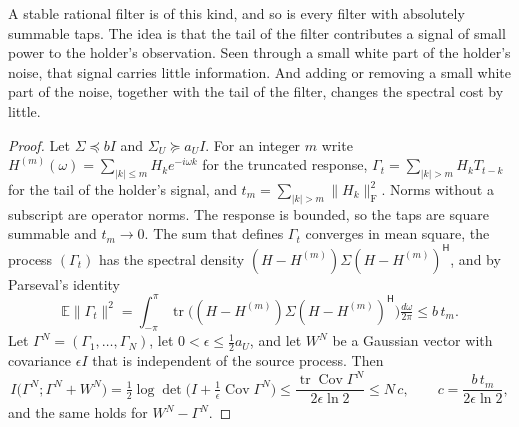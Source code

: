 \documentclass[11pt,onecolumn]{IEEEtran}
\newcommand{\E}{\mathbb{E}}
\newcommand{\tr}{\operatorname{tr}}
\newcommand{\Cov}{\operatorname{Cov}}
\newcommand{\dw}{\tfrac{d\omega}{2\pi}}
\newcommand{\herm}{\mathsf H}
\begin{document}
A stable rational filter is of this kind, and so is every filter with
absolutely summable taps. The idea is that the tail of
the filter contributes a signal of small power to the holder's
observation. Seen through a small white part of the holder's noise,
that signal carries little information. And adding or removing a small
white part of the noise, together with the tail of the filter, changes
the spectral cost by little.

\begin{proof}
Let $\Sigma\preceq bI$ and $\Sigma_U\succeq a_UI$. For an integer $m$
write $H^{(m)}(\omega)=\sum_{|k|\le m}H_ke^{-i\omega k}$ for the truncated
response, $\Gamma_t=\sum_{|k|>m}H_kT_{t-k}$ for the tail of the holder's
signal, and $t_m=\sum_{|k|>m}\|H_k\|_{\mathrm F}^2$. Norms without a
subscript are operator norms. The response is bounded, so the taps are
square summable and $t_m\to0$. The sum that defines
$\Gamma_t$ converges in mean square, the process $(\Gamma_t)$ has the
spectral density $(H-H^{(m)})\Sigma(H-H^{(m)})^{\herm}$, and by
Parseval's identity
\[
\E\|\Gamma_t\|^2=\int_{-\pi}^{\pi}\tr\bigl((H-H^{(m)})\Sigma(H-H^{(m)})^{\herm}\bigr)\dw\le b\,t_m .
\]
Let $\Gamma^N=(\Gamma_1,\dots,\Gamma_N)$, let $0<\epsilon\le\tfrac12a_U$,
and let $W^N$ be a Gaussian vector with covariance $\epsilon I$ that is
independent of the source process. Then
\begin{equation}
I\bigl(\Gamma^N;\Gamma^N+W^N\bigr)=\tfrac12\log\det\bigl(I+\tfrac1\epsilon\Cov\Gamma^N\bigr)
\le\frac{\tr\Cov\Gamma^N}{2\epsilon\ln2}\le N\,c,\qquad c=\frac{b\,t_m}{2\epsilon\ln2},
\label{eq:tailinfo}
\end{equation}
and the same holds for $W^N-\Gamma^N$.


\end{proof}
\end{document}
